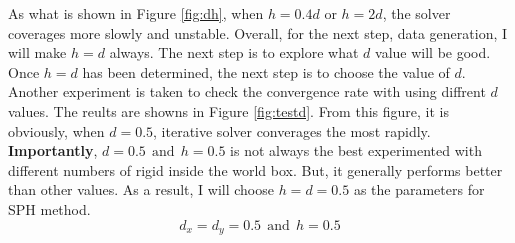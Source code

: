     As what is shown in Figure \ref{fig:dh}, when $h=0.4d$ or $h=2d$, the solver coverages more slowly and unstable. Overall, for the next step, data generation, I will make $h=d$ always. The next step is to explore what $d$ value will be good. Once $h=d$ has been determined, the next step is to choose the value of $d$. Another experiment is taken to check the convergence rate with using diffrent $d$ values. The reults are showns in Figure \ref{fig:testd}. From this figure, it is obviously, when $d=0.5$, iterative solver converages the most rapidly. 
    \textbf{Importantly}, $d=0.5~~\text{and}~~h=0.5$ is not always the best experimented with different numbers of rigid inside the world box. But, it generally performs better than other values. As a result, I will choose $h=d=0.5$ as the parameters for SPH method.
    $$d_x = d_y = 0.5~~\text{and}~~h=0.5$$
